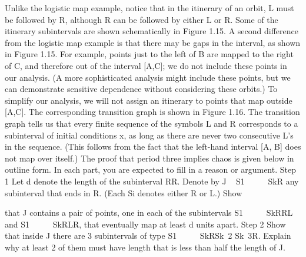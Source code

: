 \documentclass{article}
\begin{document}
Unlike the logistic map example, notice that in the itinerary of an orbit, L must be
followed by R, although R can be followed by either L or R. Some of the itinerary
subintervals are shown schematically in Figure 1.15.
A second difference from the logistic map example is that there may be gaps
in the interval, as shown in Figure 1.15. For example, points just to the left of B
are mapped to the right of C, and therefore out of the interval [A,C]; we do not
include these points in our analysis. (A more sophisticated analysis might include
these points, but we can demonstrate sensitive dependence without considering
these orbits.) To simplify our analysis, we will not assign an itinerary to points
that map outside [A,C].
The corresponding transition graph is shown in Figure 1.16. The transition
graph tells us that every finite sequence of the symbols L and R corresponds to
a subinterval of initial conditions x, as long as there are never two consecutive
L’s in the sequence. (This follows from the fact that the left-hand interval [A, B]
does not map over itself.)
The proof that period three implies chaos is given below in outline form.
In each part, you are expected to fill in a reason or argument.
Step 1 Let d denote the length of the subinterval RR. Denote by J  
S1       SkR any subinterval that ends in R. (Each Si denotes either R or L.) Show

that J contains a pair of points, one in each of the subintervals S1       SkRRL and
S1       SkRLR, that eventually map at least d units apart.
Step 2 Show that inside J there are 3 subintervals of type S1       SkRSk 2
Sk 3R. Explain why at least 2 of them must have length that is less than half the
length of J.
\end{document}
